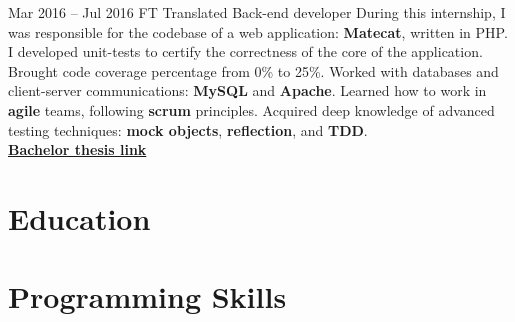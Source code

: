 \documentclass[
	12pt, %
]{../templates/FreemanCV}
\begin{document}
\begin{paracol}{2}

\jobentry
	{Mar 2016 -- Jul 2016} %
	{FT} %
	{Translated} %
	{Back-end developer} %
	{
          During this internship, I was responsible for the codebase of a web application: \textbf{Matecat}, written in PHP.
          I developed unit-tests to certify the correctness of the core of the application.
          Brought code coverage percentage from 0\% to 25\%.
          Worked with databases and client-server communications: \textbf{MySQL} and \textbf{Apache}.
          Learned how to work in \textbf{agile} teams, following \textbf{scrum} principles.
          Acquired deep knowledge of advanced testing techniques: \textbf{mock objects}, \textbf{reflection}, and \textbf{TDD}.\\
          \href{https://github.com/dinies/BachelorThesis/blob/master/EdoardoGhiniThesis.pdf}{\textbf{Bachelor thesis link}}
        }
\switchcolumn %


\section{Education}





\section{Programming Skills}



\end{paracol}
\end{document}
